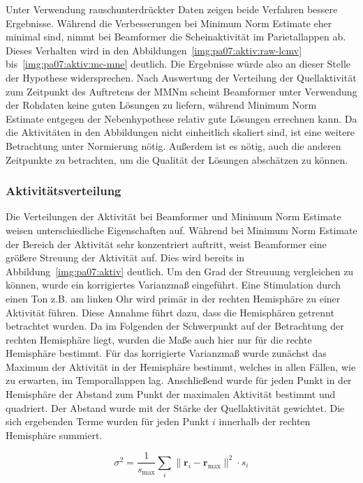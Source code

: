 \documentclass[doc,a4paper,12pt]{apa6}
\newcommand{\mx}[1]{\mathbf{#1}}
\begin{document}
Unter Verwendung rauschunterdrückter Daten zeigen beide Verfahren bessere Ergebnisse. Während die Verbesserungen bei Minimum Norm Estimate eher minimal sind, nimmt bei Beamformer die Scheinaktivität im Parietallappen ab. Dieses Verhalten wird in den Abbildungen~\ref{img:pa07:aktiv:raw-lcmv} bis~\ref{img:pa07:aktiv:mc-mne} deutlich. Die Ergebnisse würde also an dieser Stelle der Hypothese widersprechen. Nach Auswertung der Verteilung der Quellaktivität zum Zeitpunkt des Auftretens der MMNm scheint Beamformer unter Verwendung der Rohdaten keine guten Lösungen zu liefern, während Minimum Norm Estimate entgegen der Nebenhypothese relativ gute Lösungen errechnen kann. Da die Aktivitäten in den Abbildungen nicht einheitlich skaliert sind, ist eine weitere Betrachtung unter Normierung nötig. Außerdem ist es nötig, auch die anderen Zeitpunkte zu betrachten, um die Qualität der Lösungen abschätzen zu können.

\subsubsection{Aktivitätsverteilung}
\label{sec:akti-verteilung}

Die Verteilungen der Aktivität bei Beamformer und Minimum Norm Estimate weisen unterschiedliche Eigenschaften auf. Während bei Minimum Norm Estimate der Bereich der Aktivität sehr konzentriert auftritt, weist Beamformer eine größere Streuung der Aktivität auf. Dies wird bereits in Abbildung~\ref{img:pa07:aktiv} deutlich. Um den Grad der Streuuung vergleichen zu können, wurde ein korrigiertes Varianzmaß eingeführt. Eine Stimulation durch einen Ton z.B. am linken Ohr wird primär in der rechten Hemisphäre zu einer Aktivität führen. Diese Annahme führt dazu, dass die Hemisphären getrennt betrachtet wurden. Da im Folgenden der Schwerpunkt auf der Betrachtung der rechten Hemisphäre liegt, wurden die Maße auch hier nur für die rechte Hemisphäre bestimmt. Für das korrigierte Varianzmaß wurde zunächst das Maximum der Aktivität in der Hemisphäre bestimmt, welches in allen Fällen, wie zu erwarten, im Temporallappen lag. Anschließend wurde für jeden Punkt in der Hemisphäre der Abstand zum Punkt der maximalen Aktivität bestimmt und quadriert. Der Abstand wurde mit der Stärke der Quellaktivität gewichtet. Die sich ergebenden Terme wurden für jeden Punkt $i$ innerhalb der rechten Hemisphäre summiert.

\begin{equation}
\sigma^2 = \frac{1}{s_{\text{max}}} \sum_i \|\mx{r}_i - \mx{r}_{\text{max}}\|^2 \cdot s_i
\end{equation}
\end{document}
